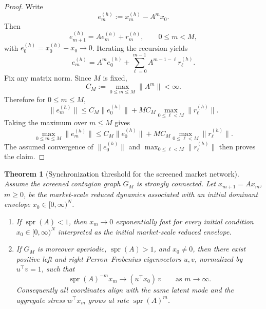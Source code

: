 \documentclass[11pt,a4paper]{amsart}
\theoremstyle{plain}
\newtheorem{theorem}{Theorem}[section]
\theoremstyle{definition}
\theoremstyle{remark}
\DeclareMathOperator{\spr}{spr}
\begin{document}
\begin{proof}
Write
\[
        e_m^{(h)}:=x_m^{(h)}-A^m x_0.
\]
Then
\[
        e_{m+1}^{(h)}
        =
        A e_m^{(h)}+r_m^{(h)},
        \qquad
        0\le m<M,
\]
with \(e_0^{(h)}=x_0^{(h)}-x_0\to0\).  Iterating the recursion yields
\[
        e_m^{(h)}
        =
        A^m e_0^{(h)}
        +
        \sum_{\ell=0}^{m-1}A^{m-1-\ell}r_\ell^{(h)}.
\]
Fix any matrix norm.  Since \(M\) is fixed,
\[
        C_M:=\max_{0\le m\le M}\|A^m\|<\infty.
\]
Therefore for \(0\le m\le M\),
\[
        \|e_m^{(h)}\|
        \le
        C_M\|e_0^{(h)}\|
        +
        M C_M \max_{0\le \ell<M}\|r_\ell^{(h)}\|.
\]
Taking the maximum over \(m\le M\) gives
\[
        \max_{0\le m\le M}\|e_m^{(h)}\|
        \le
        C_M\|e_0^{(h)}\|
        +
        M C_M \max_{0\le \ell<M}\|r_\ell^{(h)}\|.
\]
The assumed convergence of \(\|e_0^{(h)}\|\) and
\(\max_{0\le \ell<M}\|r_\ell^{(h)}\|\) then proves the claim.
\end{proof}

\begin{theorem}[Synchronization threshold for the screened market network]\label{thm:synchronization}
Assume the screened contagion graph \(G_M\) is strongly connected.
Let \(x_{m+1}=Ax_m\), \(m\ge0\), be the market-scale reduced dynamics associated with an initial
dominant envelope \(x_0\in[0,\infty)^N\).
\begin{enumerate}[label=(\roman*)]
\item If \(\spr(A)<1\), then \(x_m\to0\) exponentially fast for every initial condition
\(x_0\in[0,\infty)^N\) interpreted as the initial market-scale reduced envelope.
\item If \(G_M\) is moreover aperiodic, \(\spr(A)>1\), and \(x_0\neq0\), then there exist positive left and right
Perron--Frobenius eigenvectors \(u,v\), normalized by \(u^\top v=1\), such that
\[
        \spr(A)^{-m}x_m
        \longrightarrow
        (u^\top x_0)\,v
        \qquad
        \text{as } m\to\infty.
\]
Consequently all coordinates align with the same latent mode and the aggregate
stress \(w^\top x_m\) grows at rate \(\spr(A)^m\).
\end{enumerate}
\end{theorem}
\end{document}
